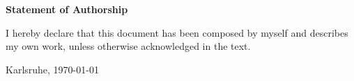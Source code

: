 \documentclass{thesisclass}
\begin{document}

\frontmatter
{}

\blankpage


\thispagestyle{plain}

\vspace*{\fill}

\centerline{\bf Statement of Authorship}

\vspace{0.25cm}

I hereby declare that this document has been composed by myself and describes my own work, unless otherwise acknowledged in the text.

\vspace{2.5cm}

\hspace{0.25cm} Karlsruhe, \today

\vspace{2cm}

\blankpage


\thispagestyle{plain}
\end{document}

